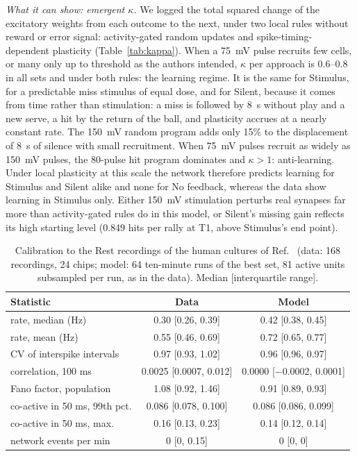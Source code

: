 \documentclass[pre,twocolumn,superscriptaddress,showpacs=false,amsmath,amssymb,nofootinbib]{revtex4-2}
\begin{document}
\emph{What it can show: emergent $\kappa$.} We logged the total squared change of the excitatory weights from each outcome to the next, under two local rules without reward or error signal: activity-gated random updates and spike-timing-dependent plasticity (Table~\ref{tab:kappa}). When a 75~mV pulse recruits few cells, or many only up to threshold as the authors intended, $\kappa$ per approach is 0.6--0.8 in all sets and under both rules: the learning regime. It is the same for Stimulus, for a predictable miss stimulus of equal dose, and for Silent, because it comes from time rather than stimulation: a miss is followed by 8~s without play and a new serve, a hit by the return of the ball, and plasticity accrues at a nearly constant rate. The 150~mV random program adds only 15\% to the displacement of 8~s of silence with small recruitment. When 75~mV pulses recruit as widely as 150~mV pulses, the 80-pulse hit program dominates and $\kappa>1$: anti-learning. Under local plasticity at this scale the network therefore predicts learning for Stimulus and Silent alike and none for No feedback, whereas the data show learning in Stimulus only. Either 150~mV stimulation perturbs real synapses far more than activity-gated rules do in this model, or Silent's missing gain reflects its high starting level (0.849 hits per rally at T1, above Stimulus's end point).

\begin{table}[t]
\caption{Calibration to the Rest recordings of the human cultures of Ref.~\cite{Kagan2022} (data: 168 recordings, 24 chips; model: 64 ten-minute runs of the best set, 81 active units subsampled per run, as in the data). Median [interquartile range].}
\label{tab:calib}
\footnotesize
\begin{ruledtabular}
\begin{tabular}{lcc}
Statistic & Data & Model \\
\hline
rate, median (Hz) & 0.30 [0.26, 0.39] & 0.42 [0.38, 0.45] \\
rate, mean (Hz) & 0.55 [0.46, 0.69] & 0.72 [0.65, 0.77] \\
CV of interspike intervals & 0.97 [0.93, 1.02] & 0.96 [0.96, 0.97] \\
correlation, 100 ms & 0.0025 [0.0007, 0.012] & 0.0000 [$-$0.0002, 0.0001] \\
Fano factor, population & 1.08 [0.92, 1.46] & 0.91 [0.89, 0.93] \\
co-active in 50 ms, 99th pct. & 0.086 [0.078, 0.100] & 0.086 [0.086, 0.099] \\
co-active in 50 ms, max. & 0.16 [0.13, 0.23] & 0.14 [0.12, 0.14] \\
network events per min & 0 [0, 0.15] & 0 [0, 0] \\
\end{tabular}
\end{ruledtabular}
\end{table}
\end{document}
